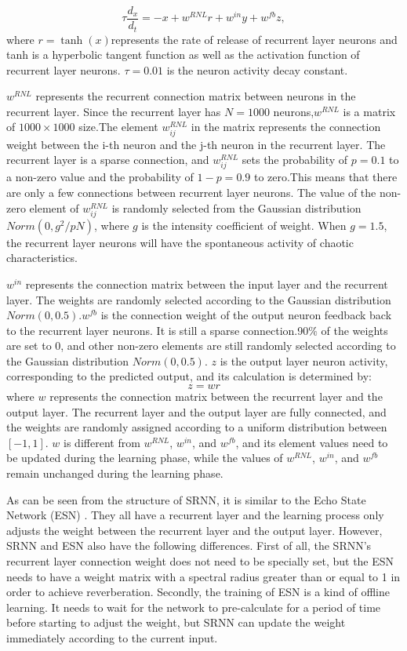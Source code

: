 \documentclass[runningheads]{llncs}
\begin{document}
\begin{equation}
\tau \frac{d_x}{d_t}=-x+w^{RNL}r+w^{in}y+w^{fb}z,
\end{equation}
where $r = \tanh(x)$represents the rate of release 
of recurrent layer neurons and tanh is a hyperbolic 
tangent function as well as the activation function of 
recurrent layer neurons. $\tau=0.01$ is the neuron activity
 decay constant.

$w^{RNL}$ represents the recurrent connection matrix between 
neurons in the recurrent layer.
Since the recurrent layer has $N=1000$ neurons,$w^{RNL}$ is a 
matrix of $1000\times1000$ size.The element $w_{ij}^{RNL}$
in the matrix represents the connection weight between 
the i-th neuron and the j-th neuron in the recurrent layer.
The recurrent layer is a sparse connection, and $w_{ij}^{RNL}$
sets the probability of $p=0.1$ to a non-zero value and the 
probability of $1-p=0.9$ to zero.This means that there are only a 
few connections between recurrent layer neurons.
The value of the non-zero element of $w_{ij}^{RNL}$ 
is randomly selected from the Gaussian distribution $Norm(0,g^{2}/pN)$,
where $g$ is the intensity coefficient of weight.
When $g=1.5$, the recurrent layer neurons will have the 
spontaneous activity of chaotic characteristics\cite{RN17}.

$w^{in}$ represents the connection matrix between the 
input layer and the recurrent layer.
The weights are randomly selected according to the 
Gaussian distribution $Norm(0, 0.5)$.$w^{fb}$ is the connection 
weight of the output neuron feedback back to the recurrent layer neurons. 
It is still a sparse connection.90$\%$ of the weights are set to 0, 
and other non-zero elements are still randomly selected according 
to the Gaussian distribution $Norm(0,0.5)$.
$z$ is the output layer neuron activity, corresponding to 
the predicted output, and its calculation is determined by:
\begin{equation}
z=wr
\end{equation}
where $w$ represents the connection matrix between the recurrent layer 
and the output layer. The recurrent layer and the output layer are 
fully connected, and the weights are randomly assigned according 
to a uniform distribution between $\left[-1,1\right]$. 
$w$ is different from $w^{RNL}$, $w^{in}$, and $w^{fb}$, and
its element values need to be updated during the learning phase,
 while the values of $w^{RNL}$, $w^{in}$, and $w^{fb}$ remain unchanged during 
 the learning phase.

As can be seen from the structure of SRNN, it is similar to the Echo 
State Network (ESN) \cite{RN22}.
They all have a recurrent layer and the learning process only adjusts 
the weight between the recurrent layer and the output layer. However, 
SRNN and ESN also have the following differences. First of all, 
the SRNN's recurrent layer connection weight does not need to be 
specially set, but the ESN needs to have a weight matrix with a 
spectral radius greater than or equal to 1 in order to achieve reverberation.
Secondly, the training of ESN is a kind of offline learning. It needs to wait 
for the network to pre-calculate for a period of time before starting to
adjust the weight, but SRNN can update the weight immediately according 
to the current input.
\end{document}
